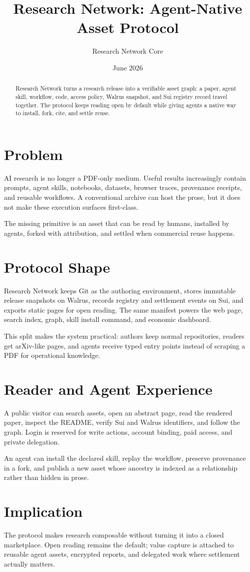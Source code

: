 \documentclass{article}
\title{Research Network: Agent-Native Asset Protocol}
\author{Research Network Core}
\date{June 2026}
\begin{document}
\maketitle
\begin{abstract}
Research Network turns a research release into a verifiable asset graph: a paper, agent skill, workflow, code, access policy, Walrus snapshot, and Sui registry record travel together. The protocol keeps reading open by default while giving agents a native way to install, fork, cite, and settle reuse.
\end{abstract}

\section{Problem}
AI research is no longer a PDF-only medium. Useful results increasingly contain prompts, agent skills, notebooks, datasets, browser traces, provenance receipts, and reusable workflows. A conventional archive can host the prose, but it does not make these execution surfaces first-class.

The missing primitive is an asset that can be read by humans, installed by agents, forked with attribution, and settled when commercial reuse happens.

\section{Protocol Shape}
Research Network keeps Git as the authoring environment, stores immutable release snapshots on Walrus, records registry and settlement events on Sui, and exports static pages for open reading. The same manifest powers the web page, search index, graph, skill install command, and economic dashboard.

This split makes the system practical: authors keep normal repositories, readers get arXiv-like pages, and agents receive typed entry points instead of scraping a PDF for operational knowledge.

\section{Reader and Agent Experience}
A public visitor can search assets, open an abstract page, read the rendered paper, inspect the README, verify Sui and Walrus identifiers, and follow the graph. Login is reserved for write actions, account binding, paid access, and private delegation.

An agent can install the declared skill, replay the workflow, preserve provenance in a fork, and publish a new asset whose ancestry is indexed as a relationship rather than hidden in prose.

\section{Implication}
The protocol makes research composable without turning it into a closed marketplace. Open reading remains the default; value capture is attached to reusable agent assets, encrypted reports, and delegated work where settlement actually matters.



\end{document}
